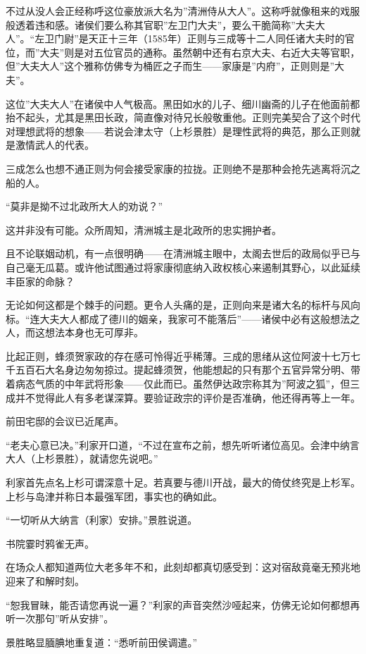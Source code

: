 \documentclass[
]{book}
\begin{document}
不过从没人会正经称呼这位豪放派大名为''清洲侍从大人''。这称呼就像租来的戏服般透着违和感。诸侯们要么称其官职''左卫门大夫''，要么干脆简称''大夫大人''。``左卫门尉''是天正十三年（1585年）正则与三成等十二人同任诸大夫时的官位，而''大夫''则是对五位官员的通称。虽然朝中还有右京大夫、右近大夫等官职，但''大夫大人''这个雅称仿佛专为桶匠之子而生------家康是''内府''，正则则是''大夫''。

这位''大夫大人''在诸侯中人气极高。黑田如水的儿子、细川幽斋的儿子在他面前都抬不起头，尤其是黑田长政，简直像对待兄长般敬重他。正则完美契合了这个时代对理想武将的想象------若说会津太守（上杉景胜）是理性武将的典范，那么正则就是激情武人的代表。

三成怎么也想不通正则为何会接受家康的拉拢。正则绝不是那种会抢先逃离将沉之船的人。

``莫非是拗不过北政所大人的劝说？''

这并非没有可能。众所周知，清洲城主是北政所的忠实拥护者。

且不论联姻动机，有一点很明确------在清洲城主眼中，太阁去世后的政局似乎已与自己毫无瓜葛。或许他试图通过将家康彻底纳入政权核心来遏制其野心，以此延续丰臣家的命脉？

无论如何这都是个棘手的问题。更令人头痛的是，正则向来是诸大名的标杆与风向标。``连大夫大人都成了德川的姻亲，我家可不能落后''------诸侯中必有这般想法之人，而这想法本身也无可厚非。

比起正则，蜂须贺家政的存在感可怜得近乎稀薄。三成的思绪从这位阿波十七万七千五百石大名身边匆匆掠过。提起蜂须贺，他能想起的只有那个五官异常分明、带着病态气质的中年武将形象------仅此而已。虽然伊达政宗称其为''阿波之狐''，但三成并不觉得此人有多老谋深算。要验证政宗的评价是否准确，他还得再等上一年。

前田宅邸的会议已近尾声。

``老夫心意已决。''利家开口道，``不过在宣布之前，想先听听诸位高见。会津中纳言大人（上杉景胜），就请您先说吧。''

利家首先点名上杉可谓深意十足。若真要与德川开战，最大的倚仗终究是上杉军。上杉与岛津并称日本最强军团，事实也的确如此。

``一切听从大纳言（利家）安排。''景胜说道。

书院霎时鸦雀无声。

在场众人都知道两位大老多年不和，此刻却都真切感受到：这对宿敌竟毫无预兆地迎来了和解时刻。

``恕我冒昧，能否请您再说一遍？''利家的声音突然沙哑起来，仿佛无论如何都想再听一次那句''听从安排''。

景胜略显腼腆地重复道：``悉听前田侯调遣。''
\end{document}
